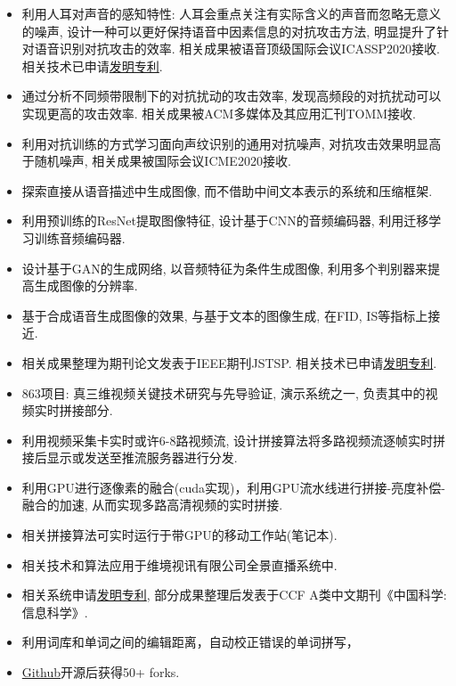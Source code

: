 \documentclass{resume}
\begin{document}
\begin{itemize}
  \item 利用人耳对声音的感知特性: 人耳会重点关注有实际含义的声音而忽略无意义的噪声, 设计一种可以更好保持语音中因素信息的对抗攻击方法, 明显提升了针对语音识别对抗攻击的效率. 相关成果被语音顶级国际会议ICASSP2020接收. 相关技术已申请\href{http://www.soopat.com/Patent/202011024815}{发明专利}.
  \item 通过分析不同频带限制下的对抗扰动的攻击效率, 发现高频段的对抗扰动可以实现更高的攻击效率. 相关成果被ACM多媒体及其应用汇刊TOMM接收.
  \item 利用对抗训练的方式学习面向声纹识别的通用对抗噪声, 对抗攻击效果明显高于随机噪声, 相关成果被国际会议ICME2020接收.
\end{itemize}
\begin{itemize}
  \item 探索直接从语音描述中生成图像, 而不借助中间文本表示的系统和压缩框架. 
  \item 利用预训练的ResNet提取图像特征, 设计基于CNN的音频编码器, 利用迁移学习训练音频编码器. 
  \item 设计基于GAN的生成网络, 以音频特征为条件生成图像, 利用多个判别器来提高生成图像的分辨率.
  \item 基于合成语音生成图像的效果, 与基于文本的图像生成, 在FID, IS等指标上接近.
  \item 相关成果整理为期刊论文发表于IEEE期刊JSTSP. 相关技术已申请\href{http://www.soopat.com/Patent/202010604773}{发明专利}.
\end{itemize}
\begin{itemize}
  \item 863项目: 真三维视频关键技术研究与先导验证, 演示系统之一, 负责其中的视频实时拼接部分. 
  \item 利用视频采集卡实时或许6-8路视频流, 设计拼接算法将多路视频流逐帧实时拼接后显示或发送至推流服务器进行分发. 
  \item 利用GPU进行逐像素的融合(cuda实现)，利用GPU流水线进行拼接-亮度补偿-融合的加速, 从而实现多路高清视频的实时拼接.
  \item 相关拼接算法可实时运行于带GPU的移动工作站(笔记本).
  \item 相关技术和算法应用于维境视讯有限公司全景直播系统中.
  \item 相关系统申请\href{http://www.soopat.com/Patent/201711100069}{发明专利}, 部分成果整理后发表于CCF A类中文期刊《中国科学:信息科学》.
\end{itemize}

\begin{itemize}
  \item 利用词库和单词之间的编辑距离，自动校正错误的单词拼写，
  \item \href{https://github.com/smallflyingpig/projects}{Github}开源后获得50+ forks.
\end{itemize}


%
%
\end{document}
